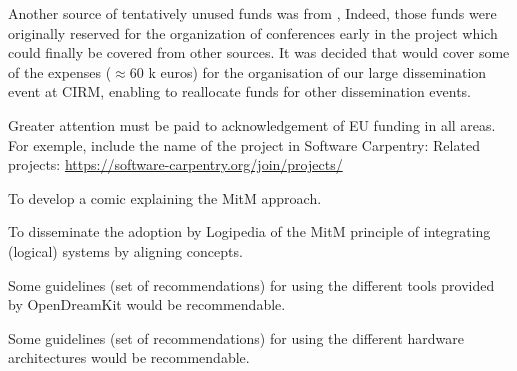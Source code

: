 Another source of tentatively unused funds was from ,
Indeed, those funds were originally reserved for the organization of
conferences early in the project which could finally be covered from
other sources. It was decided that  would cover some of
the expenses ($\approx$60 k euros) for the organisation of our large
dissemination event at CIRM, enabling  to reallocate funds
for other dissemination events.

\begin{recommendation}
  Greater attention must be paid to acknowledgement of EU funding in
  all areas. For exemple, include the name of the project in Software
  Carpentry: Related projects:
  \url{https://software-carpentry.org/join/projects/}
\end{recommendation}

\begin{recommendation}
  To develop a comic explaining the MitM approach.
\end{recommendation}

\begin{recommendation}
  To disseminate the adoption by Logipedia of the MitM principle of
  integrating (logical) systems by aligning concepts.
\end{recommendation}

\begin{recommendation}
  Some guidelines (set of recommendations) for using the different
  tools provided by OpenDreamKit would be recommendable.
\end{recommendation}

\begin{recommendation}
  Some guidelines (set of recommendations) for using the different
  hardware architectures would be recommendable.
\end{recommendation}



